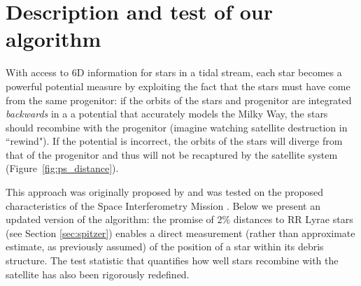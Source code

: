 \section{Description and test of our algorithm}
\label{sec:method}
With access to 6D information for stars in a tidal
stream, each star becomes a powerful potential
measure by exploiting the fact that the stars must have come from the
same progenitor: if the orbits of the stars and progenitor are integrated 
\emph{backwards} in a a potential that accurately models the Milky Way, the stars
should recombine with the progenitor (imagine watching satellite destruction in ``rewind"). If the potential is incorrect,
the orbits of the stars will diverge from that of the progenitor and
thus will not be recaptured by the satellite system (Figure~\ref{fig:ps_distance}).

This approach was originally proposed by \citet{johnston99a} and was tested on the proposed characteristics of the Space
Interferometry Mission \citep{unwin08}. Below we present an updated version of the algorithm:
the promise of 2\% distances to RR Lyrae stars (see Section
\ref{sec:spitzer}) enables a direct measurement (rather than
approximate estimate, as previously assumed) of the position of a star within its debris
structure. The test statistic that quantifies how well stars recombine
with the satellite has also been rigorously redefined.

